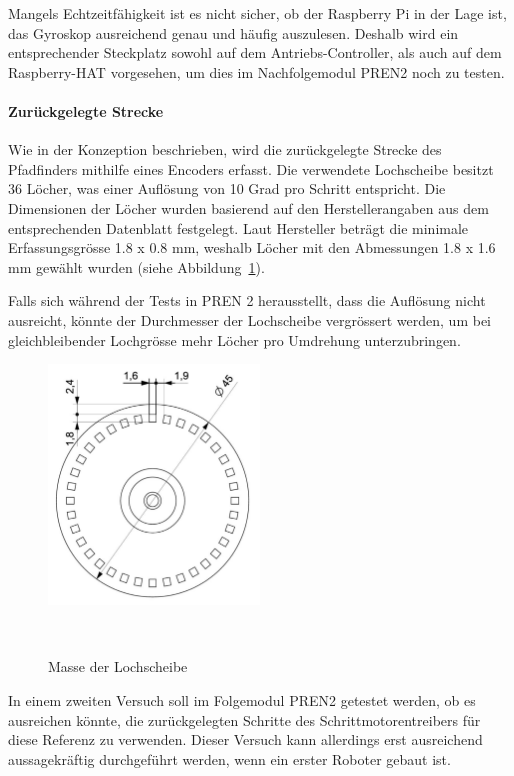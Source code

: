 \documentclass[main.tex]{subfiles} %
\begin{document}
Mangels Echtzeitfähigkeit ist es nicht sicher, ob der Raspberry Pi in der Lage
ist, das Gyroskop ausreichend genau und häufig auszulesen. Deshalb wird ein
entsprechender Steckplatz sowohl auf dem Antriebs-Controller, als auch auf dem
Raspberry-HAT vorgesehen, um dies im Nachfolgemodul PREN2 noch zu testen.

\paragraph{Zurückgelegte Strecke}
Wie in der Konzeption beschrieben, wird die zurückgelegte Strecke des
Pfadfinders mithilfe eines Encoders erfasst. Die verwendete Lochscheibe besitzt
36 Löcher, was einer Auflösung von 10 Grad pro Schritt entspricht. Die
Dimensionen der Löcher wurden basierend auf den Herstellerangaben aus dem
entsprechenden Datenblatt festgelegt. Laut Hersteller beträgt die minimale
Erfassungsgrösse 1.8 x 0.8 mm, weshalb Löcher mit den Abmessungen 1.8 x 1.6 mm
gewählt wurden (siehe Abbildung~\ref{fig:Lochscheibe_Vermasst}).

Falls sich während der Tests in PREN 2 herausstellt, dass die Auflösung nicht
ausreicht, könnte der Durchmesser der Lochscheibe vergrössert werden, um bei
gleichbleibender Lochgrösse mehr Löcher pro Umdrehung unterzubringen.

\begin{figure}[H]
    \centering
    \includegraphics[width=0.5\textwidth]{./fig_Strecke_Tracken/Encoderscheibe_Vermasst.pdf}
    \caption{Masse der Lochscheibe}~\label{fig:Lochscheibe_Vermasst}
\end{figure}

In einem zweiten Versuch soll im Folgemodul PREN2 getestet werden, ob es
ausreichen könnte, die zurückgelegten Schritte des Schrittmotorentreibers für
diese Referenz zu verwenden. Dieser Versuch kann allerdings erst ausreichend
aussagekräftig durchgeführt werden, wenn ein erster Roboter gebaut ist.
\end{document}
